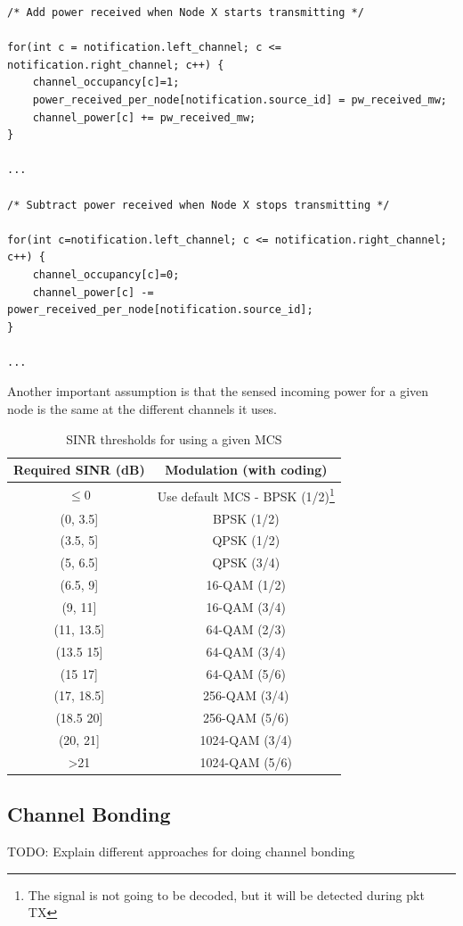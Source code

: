 \documentclass[a4paper]{article}
\begin{document}
\begin{lstlisting}
/* Add power received when Node X starts transmitting */

for(int c = notification.left_channel; c <= notification.right_channel; c++) {
	channel_occupancy[c]=1;		
	power_received_per_node[notification.source_id] = pw_received_mw;
	channel_power[c] += pw_received_mw;
}

...

/* Subtract power received when Node X stops transmitting */

for(int c=notification.left_channel; c <= notification.right_channel; c++) {
	channel_occupancy[c]=0;
	channel_power[c] -= power_received_per_node[notification.source_id];
}

...
\end{lstlisting}

Another important assumption is that the sensed incoming power for a given node is the same at the different channels it uses.

\begin{table}[h!]
\centering
\caption{SINR thresholds for using a given MCS}
\label{tbl:sinr_thresholds_mcs}
\begin{tabular}{|c|c|}
\hline
\textbf{Required SINR (dB)} & \textbf{Modulation (with coding)} \\ \hline
$\leq 0$ & Use default MCS - BPSK (1/2)\footnote{The signal is not going to be decoded, but it will be detected during pkt TX} \\ \hline
(0, 3.5] & BPSK (1/2) \\ \hline
(3.5, 5] & QPSK (1/2) \\ \hline
(5, 6.5] & QPSK (3/4) \\ \hline
(6.5, 9] & 16-QAM (1/2) \\ \hline
(9, 11] & 16-QAM (3/4) \\ \hline
(11, 13.5] & 64-QAM (2/3) \\ \hline
(13.5 15] & 64-QAM (3/4) \\ \hline
(15 17] & 64-QAM (5/6) \\ \hline
(17, 18.5] & 256-QAM (3/4) \\ \hline
(18.5 20] & 256-QAM (5/6) \\ \hline
(20, 21] & 1024-QAM (3/4) \\ \hline
\textgreater 21 & 1024-QAM (5/6) \\ \hline
\end{tabular}
\end{table}

\subsection{Channel Bonding}
TODO: Explain different approaches for doing channel bonding
\end{document}
